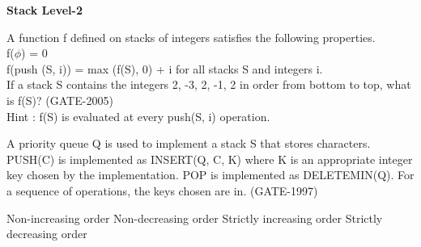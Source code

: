 
\centerline{\textbf{ \LARGE Stack Level-2}}


\begin{questyle}

  \question  A function f defined on stacks of integers satisfies the following properties. \\
             f(\(\phi\)) = 0  \\
             f(push (S, i)) = max (f(S), 0) + i for all stacks S and integers i. \\
             If a stack S contains the integers 2, -3, 2, -1, 2 in order from bottom to top, what is f(S)?  (GATE-2005)\\
             Hint : f(S) is evaluated at every push(S, i) operation.\\
  \begin{oneparchoices}
  \end{oneparchoices}

\end{questyle}


\begin{questyle}
  \question  A priority queue Q is used to implement a stack S that stores characters. PUSH(C) is implemented as
             INSERT(Q, C, K) where K is an appropriate integer key chosen by the implementation. POP is implemented as
             DELETEMIN(Q). For a sequence of operations, the keys chosen are in.  (GATE-1997)

  \begin{choices}
    \choice         Non-increasing order
    \choice         Non-decreasing order
    \choice         Strictly increasing order
    \CorrectChoice  Strictly decreasing order
  \end{choices}
\end{questyle}


